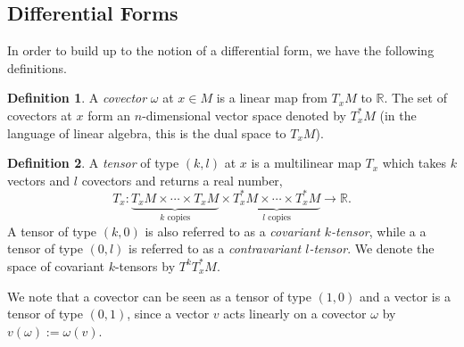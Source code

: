 \documentclass[12pt,a4paper]{article}
\numberwithin{equation}{section}
\theoremstyle{definition}
\newtheorem{definition}{Definition}[section]
\theoremstyle{remark}
\begin{document}
\subsection{Differential Forms}
In order to build up to the notion of a differential form, we have the following definitions.
\begin{definition}
A \textit{covector} $\omega$ at $x\in M$ is a linear map from $T_xM$ to $\mathbb{R}$. The set of covectors at $x$ form an $n$-dimensional vector space denoted by $T^*_xM$ (in the language of linear algebra, this is the dual space to $T_xM$).
\end{definition}
\begin{definition}
A \textit{tensor} of type $(k,l)$ at $x$ is a multilinear map $T_x$ which takes $k$ vectors and $l$ covectors and returns a real number,
\[
T_x:\underbrace{T_xM\times\cdots\times T_xM}_{k\text{ copies}}\times\underbrace{T^*_xM\times\cdots\times T^*_xM}_{l\text{ copies}}\to\mathbb{R}.
\]
A tensor of type $(k,0)$ is also referred to as a \textit{covariant $k$-tensor}, while a a tensor of type $(0,l)$ is referred to as a \textit{contravariant $l$-tensor}. We denote the space of covariant $k$-tensors by $T^kT^*_xM$.
\end{definition}
We note that a covector can be seen as a tensor of type $(1,0)$ and a vector is a tensor of type $(0,1)$, since a vector $v$ acts linearly on a covector $\omega$ by $v(\omega):=\omega(v)$.\\
\end{document}
